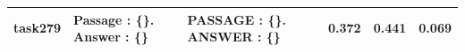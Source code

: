 \begin{table}[]
\begin{tabular}{@{}cp{4.2cm\ttfamily\tiny}p{4.2cm\ttfamily\tiny}ccc@{}}
task279    & Passage : \{\}. Answer : \{\}                                                                                                                                               & PASSAGE : \{\}. ANSWER : \{\}                                                                                                                                                         & 0.372  & 0.441  & 0.069     \\ \bottomrule
\end{tabular}
\vspace{-3.5mm}
\end{table}

